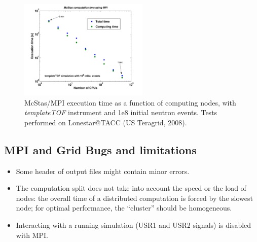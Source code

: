 \begin{figure}[htb!]
  \begin{center}
    \includegraphics[width=0.55\textwidth]{figures/mpi_efficiency}
  \end{center}
  \caption{McStas/MPI execution time as a function of computing nodes, with
   \textit{templateTOF} instrument and 1e8 initial neutron events. Tests performed on
    Lonestar@TACC (US Teragrid, 2008).}
\label{fig:mpi_efficiency}
\end{figure}

\subsection{MPI and Grid Bugs and limitations}

\begin{itemize}
\item Some header of output files might contain minor errors.
\item The computation split does not take into account the speed or the
  load of nodes: the overall time of a distributed computation is
  forced by the slowest node; for optimal performance, the ``cluster''
  should be homogeneous.
\item Interacting with a running simulation (USR1 and USR2 signals) is disabled
  with MPI.
\end{itemize}

